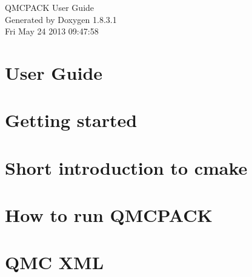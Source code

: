 \documentclass{book}
\begin{document}
\hypersetup{pageanchor=false,citecolor=blue}
\begin{titlepage}
\vspace*{7cm}
\begin{center}
{\Large QMCPACK User Guide}\\
\vspace*{1cm}
{\large Generated by Doxygen 1.8.3.1}\\
\vspace*{0.5cm}
{\small Fri May 24 2013 09:47:58}\\
\end{center}
\end{titlepage}
\clearemptydoublepage
{}
\tableofcontents
\clearemptydoublepage
{}
\hypersetup{pageanchor=true,citecolor=blue}
\chapter{User Guide}
\label{index}
\chapter{Getting started}
\label{firstp}

\chapter{Short introduction to cmake}
\label{cmakep}

\chapter{How to run Q\-M\-C\-P\-A\-C\-K}
\label{inputp}

\chapter{Q\-M\-C X\-M\-L}
\label{xmldocp}

\printindex
\end{document}
